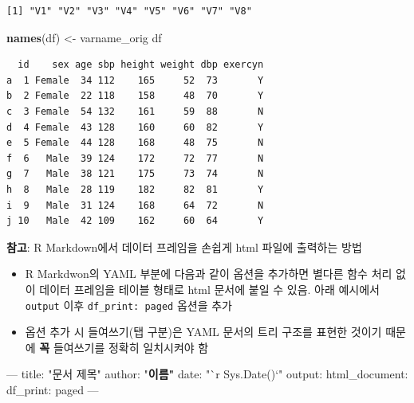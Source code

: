 \documentclass[
  11pt,
]{krantz}
\newenvironment{Shaded}{\begin{snugshade}}{\end{snugshade}}
\newcommand{\AttributeTok}[1]{\textcolor[rgb]{0.61,0.61,0.61}{#1}}
\newcommand{\ErrorTok}[1]{\textcolor[rgb]{0.14,0.14,0.14}{\textbf{#1}}}
\newcommand{\FunctionTok}[1]{\textcolor[rgb]{0,0,0}{#1}}
\newcommand{\KeywordTok}[1]{\textcolor[rgb]{0.27,0.27,0.27}{\textbf{#1}}}
\newcommand{\NormalTok}[1]{#1}
\newcommand{\OtherTok}[1]{\textcolor[rgb]{0.37,0.37,0.37}{#1}}
\newcommand{\StringTok}[1]{\textcolor[rgb]{0.5,0.5,0.5}{#1}}
\providecommand{\tightlist}{%
  \setlength{\itemsep}{0pt}\setlength{\parskip}{0pt}}
\let\BeginKnitrBlock\begin \let\EndKnitrBlock\end
\begin{document}
\begin{verbatim}
[1] "V1" "V2" "V3" "V4" "V5" "V6" "V7" "V8"
\end{verbatim}

\begin{Shaded}
\begin{Highlighting}[]
\KeywordTok{names}\NormalTok{(df) <-}\StringTok{ }\NormalTok{varname_orig}
\NormalTok{df}
\end{Highlighting}
\end{Shaded}

\begin{verbatim}
  id    sex age sbp height weight dbp exercyn
a  1 Female  34 112    165     52  73       Y
b  2 Female  22 118    158     48  70       Y
c  3 Female  54 132    161     59  88       N
d  4 Female  43 128    160     60  82       Y
e  5 Female  44 128    168     48  75       N
f  6   Male  39 124    172     72  77       N
g  7   Male  38 121    175     73  74       N
h  8   Male  28 119    182     82  81       Y
i  9   Male  31 124    168     64  72       N
j 10   Male  42 109    162     60  64       Y
\end{verbatim}

\normalsize

\footnotesize

\BeginKnitrBlock{rmdtip}
\textbf{참고}: R Markdown에서 데이터 프레임을 손쉽게 html 파일에 출력하는 방법

\begin{itemize}
\tightlist
\item
  R Markdwon의 YAML 부분에 다음과 같이 옵션을 추가하면 별다른 함수 처리 없이 데이터 프레임을 테이블 형태로 html 문서에 붙일 수 있음. 아래 예시에서 \texttt{output} 이후 \texttt{df\_print:\ paged} 옵션을 추가
\item
  옵션 추가 시 들여쓰기(탭 구분)은 YAML 문서의 트리 구조를 표현한 것이기 때문에 \textbf{꼭} 들여쓰기를 정확히 일치시켜야 함
\end{itemize}
\EndKnitrBlock{rmdtip}

\normalsize

\footnotesize

\begin{Shaded}
\begin{Highlighting}[]
\OtherTok{---}
\FunctionTok{title:}\AttributeTok{ }\StringTok{"문서 제목"}
\StringTok{author: "}\ErrorTok{이름"}
\FunctionTok{date:}\AttributeTok{ }\StringTok{"`r Sys.Date()`"}
\FunctionTok{output:}\AttributeTok{ }
  \FunctionTok{html_document:}\AttributeTok{ }
    \FunctionTok{df_print:}\AttributeTok{ paged}
\OtherTok{---}
\end{Highlighting}
\end{Shaded}
\end{document}
